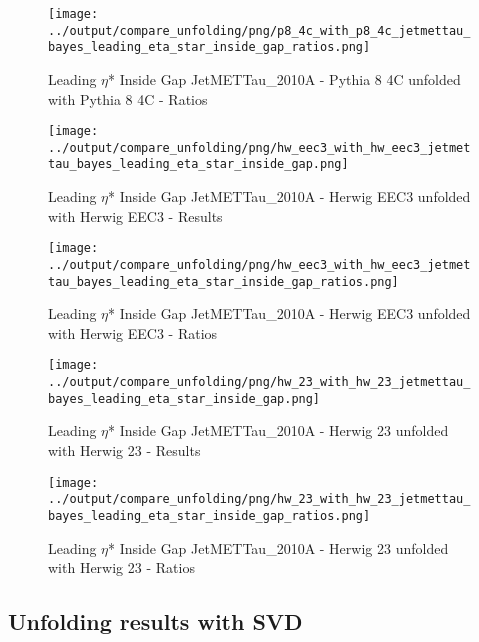 \documentclass[11pt]{book}
\begin{document}
\begin{figure}[ht]
\centering
\texttt{[image: ../output/compare\_unfolding/png/p8\_4c\_with\_p8\_4c\_jetmettau\_bayes\_leading\_eta\_star\_inside\_gap\_ratios.png]}
\caption{Leading $\eta$* Inside Gap JetMETTau\_2010A - Pythia 8 4C unfolded with Pythia 8 4C - Ratios}
\label{p8_p8_jetmettau_bayes_leading_eta_star_inside_gap_b}
\end{figure}

\begin{figure}[ht]
\centering
\texttt{[image: ../output/compare\_unfolding/png/hw\_eec3\_with\_hw\_eec3\_jetmettau\_bayes\_leading\_eta\_star\_inside\_gap.png]}
\caption{Leading $\eta$* Inside Gap JetMETTau\_2010A - Herwig EEC3 unfolded with Herwig EEC3 - Results}
\label{hw_eec3_hw_eec3_jetmettau_bayes_leading_eta_star_inside_gap_a}
\end{figure}

\begin{figure}[ht]
\centering
\texttt{[image: ../output/compare\_unfolding/png/hw\_eec3\_with\_hw\_eec3\_jetmettau\_bayes\_leading\_eta\_star\_inside\_gap\_ratios.png]}
\caption{Leading $\eta$* Inside Gap JetMETTau\_2010A - Herwig EEC3 unfolded with Herwig EEC3 - Ratios}
\label{hw_eec3_hw_eec3_jetmettau_bayes_leading_eta_star_inside_gap_b}
\end{figure}

\begin{figure}[ht]
\centering
\texttt{[image: ../output/compare\_unfolding/png/hw\_23\_with\_hw\_23\_jetmettau\_bayes\_leading\_eta\_star\_inside\_gap.png]}
\caption{Leading $\eta$* Inside Gap JetMETTau\_2010A - Herwig 23 unfolded with Herwig 23 - Results}
\label{hw_23_hw_23_jetmettau_bayes_leading_eta_star_inside_gap_a}
\end{figure}

\begin{figure}[ht]
\centering
\texttt{[image: ../output/compare\_unfolding/png/hw\_23\_with\_hw\_23\_jetmettau\_bayes\_leading\_eta\_star\_inside\_gap\_ratios.png]}
\caption{Leading $\eta$* Inside Gap JetMETTau\_2010A - Herwig 23 unfolded with Herwig 23 - Ratios}
\label{hw_23_hw_23_jetmettau_bayes_leading_eta_star_inside_gap_b}
\end{figure}

\clearpage
\subsection{Unfolding results with SVD}
\end{document}
